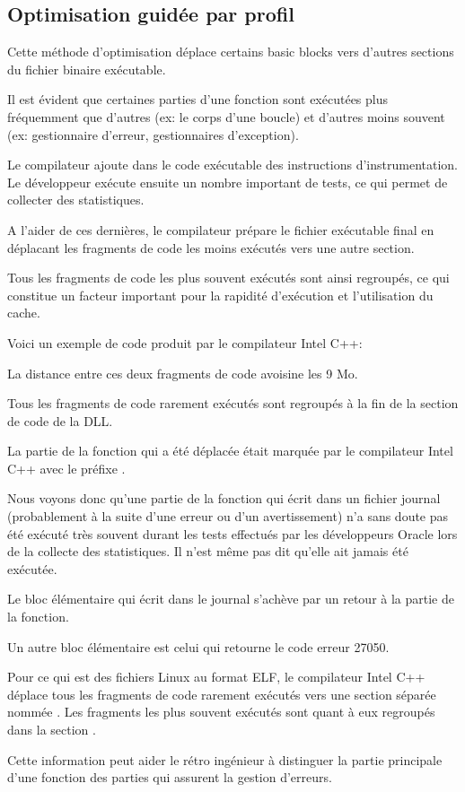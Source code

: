 ﻿


\subsection{Optimisation guidée par profil}
\label{PGO}

\myindex{\oracle}

Cette méthode d'optimisation déplace certains \gls{basic block}s vers d'autres sections du fichier 
binaire exécutable.

Il est évident que certaines parties d'une fonction sont exécutées plus fréquemment que d'autres
(ex: le corps d'une boucle) et d'autres moins souvent (ex: gestionnaire d'erreur, gestionnaires 
d'exception).

Le compilateur ajoute dans le code exécutable des instructions d'instrumentation. Le développeur 
exécute ensuite un nombre important de tests, ce qui permet de collecter des statistiques.

A l'aider de ces dernières, le compilateur prépare le fichier exécutable final en déplacant les 
fragments de code les moins exécutés vers une autre section.

Tous les fragments de code les plus souvent exécutés sont ainsi regroupés, ce qui constitue un 
facteur important pour la rapidité d'exécution et l'utilisation du cache.

Voici un exemple de code \oracle produit par le compilateur Intel C++:



La distance entre ces deux fragments de code avoisine les 9 Mo.

Tous les fragments de code rarement exécutés sont regroupés à la fin de la section de code de la DLL.

La partie de la fonction qui a été déplacée était marquée par le compilateur Intel C++ avec le 
préfixe .

Nous voyons donc qu'une partie de la fonction qui écrit dans un fichier journal (probablement à la 
suite d'une erreur ou d'un avertissement) n'a sans doute pas été exécuté très souvent durant les 
tests effectués par les développeurs Oracle lors de la collecte des statistiques. Il n'est même pas 
dit qu'elle ait jamais été exécutée.

Le bloc élémentaire qui écrit dans le journal s'achève par un retour à la partie  de la 
fonction.

Un autre bloc élémentaire  est celui qui retourne le code erreur 27050.

Pour ce qui est des fichiers Linux au format ELF, le compilateur Intel C++ déplace tous les 
fragments de code rarement exécutés vers une section séparée nommée . 
Les fragments les plus souvent exécutés sont quant à eux regroupés dans la section .

Cette information peut aider le rétro ingénieur à distinguer la partie principale d'une fonction 
des parties qui assurent la gestion d'erreurs.

